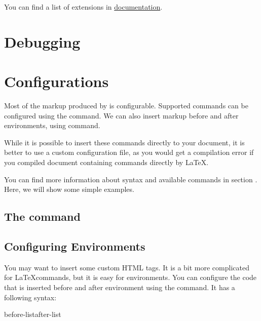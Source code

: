 You can find a list of extensions in \href{https://www.kodymirus.cz/make4ht/make4ht-doc.html#extensions}{\makefourht{} documentation}.

\section{Debugging}


\section{Configurations}
\label{sec:tutorial-configurations}

Most of the markup produced by \texfourht{} is configurable. Supported commands 
can be configured using the \texcommand{\Configure} command. We can also insert 
markup before and after environments, using \texcommand{\ConfigureEnv} command.

While it is possible to insert these commands directly to your document, it is better
to use a custom configuration file, as you would get a compilation error if you compiled 
document containing \texfourht{} commands directly by \LaTeX.


You can find more information about syntax and available commands in section .
Here, we will show some simple examples.

\subsection{The  command}


\subsection{Configuring Environments}

You may want to insert some custom HTML tags. It is a bit more complicated for
\LaTeX commands, but it is easy for environments. You can configure the code that is 
inserted before and after environment using the \texcommand{\ConfigureEnv} command.
It has a following syntax:

\begin{texsource}
{before-list}{after-list}
\end{texsource}

